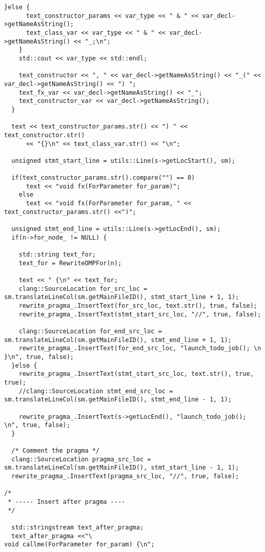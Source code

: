 \documentclass[a4paper,10pt,twoside]{book}
\begin{document}
\begin{lstlisting}[language=CCC, caption=driver/program.cpp]
    }else {
      text_constructor_params << var_type << " & " << var_decl->getNameAsString();
      text_class_var << var_type << " & " << var_decl->getNameAsString() << "_;\n";
    }
    std::cout << var_type << std::endl;

    text_constructor << ", " << var_decl->getNameAsString() << "_(" << var_decl->getNameAsString() << ") ";
    text_fx_var << var_decl->getNameAsString() << "_";
    text_constructor_var << var_decl->getNameAsString();
  }

  text << text_constructor_params.str() << ") " << text_constructor.str() 
      << "{}\n" << text_class_var.str() << "\n";    
  
  unsigned stmt_start_line = utils::Line(s->getLocStart(), sm);
  
  if(text_constructor_params.str().compare("") == 0)
      text << "void fx(ForParameter for_param)";
    else
      text << "void fx(ForParameter for_param, " << text_constructor_params.str() <<")";
  
  unsigned stmt_end_line = utils::Line(s->getLocEnd(), sm);
  if(n->for_node_ != NULL) {
    
    std::string text_for;
    text_for = RewriteOMPFor(n);

    text << " {\n" << text_for;
    clang::SourceLocation for_src_loc = sm.translateLineCol(sm.getMainFileID(), stmt_start_line + 1, 1);
    rewrite_pragma_.InsertText(for_src_loc, text.str(), true, false);
    rewrite_pragma_.InsertText(stmt_start_src_loc, "//", true, false);
    
    clang::SourceLocation for_end_src_loc = sm.translateLineCol(sm.getMainFileID(), stmt_end_line + 1, 1);
    rewrite_pragma_.InsertText(for_end_src_loc, "launch_todo_job(); \n }\n", true, false);
  }else {
    rewrite_pragma_.InsertText(stmt_start_src_loc, text.str(), true, true);
    //clang::SourceLocation stmt_end_src_loc = sm.translateLineCol(sm.getMainFileID(), stmt_end_line - 1, 1);
    
    rewrite_pragma_.InsertText(s->getLocEnd(), "launch_todo_job(); \n", true, false);
  }

  /* Comment the pragma */
  clang::SourceLocation pragma_src_loc = sm.translateLineCol(sm.getMainFileID(), stmt_start_line - 1, 1);
  rewrite_pragma_.InsertText(pragma_src_loc, "//", true, false);
  
/*
 * ----- Insert after pragma ----
 */
   
  std::stringstream text_after_pragma;
  text_after_pragma <<"\
void callme(ForParameter for_param) {\n";


\end{lstlisting}
\end{document}
